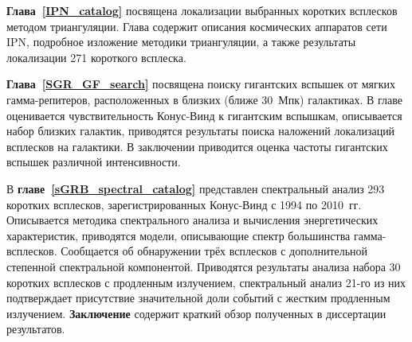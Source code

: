 \textbf{Глава~\ref{IPN_catalog}} посвящена локализации выбранных коротких всплесков 
методом триангуляции. Глава содержит описания космических аппаратов сети IPN, 
подробное изложение методики триангуляции, а также результаты локализации 
271 короткого всплеска.  

\textbf{Глава~\ref{SGR_GF_search}} посвящена поиску гигантских вспышек от мягких
гамма-репитеров, расположенных в близких (ближе 30~Мпк) галактиках.
В главе оценивается чувствительность Конус-Винд к гигантским вспышкам, 
описывается набор близких галактик, приводятся результаты поиска наложений локализаций
всплесков на галактики. В заключении приводится оценка частоты гигантских вспышек различной 
интенсивности.

В \textbf{главе~\ref{sGRB_spectral_catalog}} представлен спектральный анализ 293
коротких всплесков, зарегистрированных Конус-Винд с 1994 по 2010~гг. 
Описывается методика спектрального анализа и вычисления энергетических характеристик,
приводятся модели, описывающие спектр большинства гамма-всплесков.
Сообщается об обнаружении трёх всплесков с дополнительной степенной спектральной
компонентой. Приводятся результаты анализа набора 30 коротких всплесков с продленным излучением, 
спектральный анализ 21-го из них подтверждает присутствие значительной доли 
событий с жестким продленным излучением.   
\enlargethispage{4\baselineskip}
\textbf{Заключение} содержит краткий обзор полученных в диссертации результатов.

\clearpage